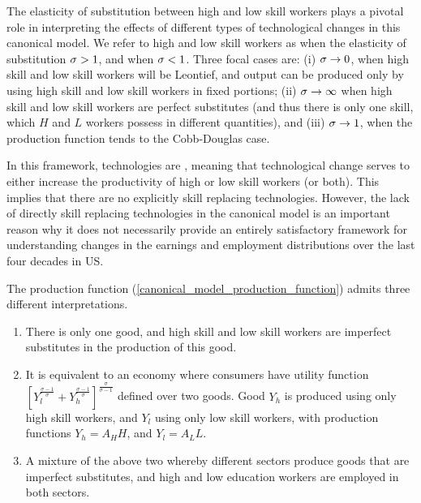\documentclass[12pt]{article}
\newcommand{\highlightB}[1]{{\emph{\color{MyBlue}{#1}}}}
\newcommand{\highlightP}[1]{{\emph{\color{MyPink}{#1}}}}
\theoremstyle{definition}
\begin{document}
\highlightP{Need more calculation here about the production function!}

The elasticity of substitution between high and low skill workers plays a pivotal role in interpreting the effects of different types of technological changes in this canonical model. We refer to high and low skill workers as \highlightB{gross substitutes} when the elasticity of substitution $\sigma > 1$, and \highlightB{gross complements} when $\sigma < 1$. Three focal cases are: (i) $\sigma \rightarrow 0$, when high skill and low skill workers will be Leontief, and output can be produced only by using high skill and low skill workers in fixed portions; (ii) $\sigma \rightarrow \infty$ when high skill and low skill workers are perfect substitutes (and thus there is only one skill, which $H$ and $L$ workers possess in different quantities), and (iii) $\sigma \rightarrow 1$, when the production function tends to the Cobb-Douglas case. 

In this framework, technologies are \highlightB{factor-augmenting}, meaning that technological change serves to either increase the productivity of high or low skill workers (or both). This implies that there are no explicitly skill replacing technologies. However, the lack of directly skill replacing technologies in the canonical model is an important reason why it does not necessarily provide an entirely satisfactory framework for understanding changes in the earnings and employment distributions over the last four decades in US. 

The production function (\ref{canonical_model_production_function}) admits three different interpretations.
\begin{enumerate}[topsep=0pt, leftmargin=20pt, itemsep=0pt, label=(\arabic*)]
\setlength{\parskip}{10pt} 

\item There is only one good, and high skill and low skill workers are imperfect substitutes in the production of this good. 

\item It is equivalent to an economy where consumers have utility function $\left[Y_l^{\frac{\sigma-1}{\sigma}}+Y_h^{\frac{\sigma-1}{\sigma}}\right]^{\frac{\sigma}{\sigma-1}}$ defined over two goods. Good $Y_h$ is produced using only high skill workers, and $Y_l$ using only low skill workers, with production functions $Y_h = A_H H$, and $Y_l = A_L L$.

\item A mixture of the above two whereby different sectors produce goods that are imperfect substitutes, and high and low education workers are employed in both sectors.
\end{enumerate}
\end{document}
